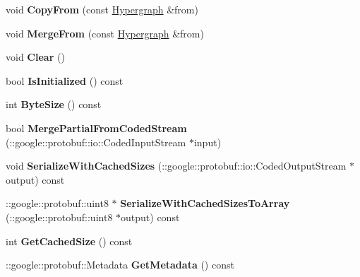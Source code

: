 \begin{DoxyCompactItemize}
\item 
\hypertarget{classHypergraph_a4715ac922c373c335985c25f9766a526}{
void {\bfseries CopyFrom} (const \hyperlink{classHypergraph}{Hypergraph} \&from)}
\label{classHypergraph_a4715ac922c373c335985c25f9766a526}

\item 
\hypertarget{classHypergraph_a5e48c533c90271a6e018a26ac8a70538}{
void {\bfseries MergeFrom} (const \hyperlink{classHypergraph}{Hypergraph} \&from)}
\label{classHypergraph_a5e48c533c90271a6e018a26ac8a70538}

\item 
\hypertarget{classHypergraph_a3377b5de90d222621cc41c2c41b7865d}{
void {\bfseries Clear} ()}
\label{classHypergraph_a3377b5de90d222621cc41c2c41b7865d}

\item 
\hypertarget{classHypergraph_a5327b9372e5dd8dd4e435b160e5f16df}{
bool {\bfseries IsInitialized} () const }
\label{classHypergraph_a5327b9372e5dd8dd4e435b160e5f16df}

\item 
\hypertarget{classHypergraph_ab4aa8a83cd1da71a9f31bdad594ffaf0}{
int {\bfseries ByteSize} () const }
\label{classHypergraph_ab4aa8a83cd1da71a9f31bdad594ffaf0}

\item 
\hypertarget{classHypergraph_a30583bfba242ae1439903bc24d069e24}{
bool {\bfseries MergePartialFromCodedStream} (::google::protobuf::io::CodedInputStream $\ast$input)}
\label{classHypergraph_a30583bfba242ae1439903bc24d069e24}

\item 
\hypertarget{classHypergraph_a7e8e7f4fe037cbfeb1f0a46e7616fc78}{
void {\bfseries SerializeWithCachedSizes} (::google::protobuf::io::CodedOutputStream $\ast$output) const }
\label{classHypergraph_a7e8e7f4fe037cbfeb1f0a46e7616fc78}

\item 
\hypertarget{classHypergraph_a4d695da7efbbcc2444fb1836e88d8849}{
::google::protobuf::uint8 $\ast$ {\bfseries SerializeWithCachedSizesToArray} (::google::protobuf::uint8 $\ast$output) const }
\label{classHypergraph_a4d695da7efbbcc2444fb1836e88d8849}

\item 
\hypertarget{classHypergraph_a34d579551c68eb5e039062269f875522}{
int {\bfseries GetCachedSize} () const }
\label{classHypergraph_a34d579551c68eb5e039062269f875522}

\item 
\hypertarget{classHypergraph_a5e8ebd56fb4cdfcaa19b9aa43cf25fbd}{
::google::protobuf::Metadata {\bfseries GetMetadata} () const }
\label{classHypergraph_a5e8ebd56fb4cdfcaa19b9aa43cf25fbd}


\end{DoxyCompactItemize}
